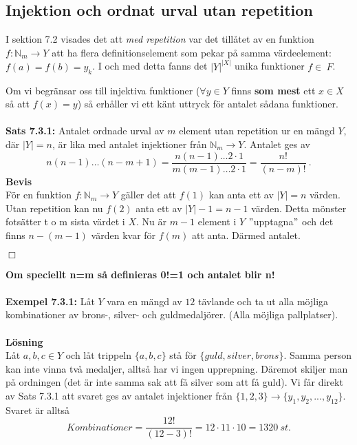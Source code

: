 \documentclass{article}
\begin{document}
\subsection{Injektion och ordnat urval utan repetition}
I sektion 7.2 visades det att \textit{med repetition} var det tillåtet av en funktion $f:\mathbb{N}_m\rightarrow Y$ att ha flera definitionselement som pekar på samma värdeelement: $f(a)=f(b)=y_k$. I och med detta fanns det $|Y|^{|X|}$ unika funktioner $f\in\ F$.

Om vi begränsar oss till injektiva funktioner ($\forall y\in Y$ finns \textbf{som mest} ett $x\in X$ så att $f(x)=y$) så erhåller vi ett känt uttryck för antalet sådana funktioner.\\ \\
\textbf{Sats 7.3.1:} Antalet ordnade urval av $m$ element utan repetition ur en mängd $Y$, där $|Y|=n$, är lika med antalet injektioner från $\mathbb{N}_m\rightarrow Y$. Antalet ges av 
$$
n(n-1)\hdots(n-m+1)=\frac{n(n-1)\hdots2\cdot1}{m(m-1)\hdots2\cdot1}=\frac{n!}{(n-m)!} \ .
$$
\textbf{Bevis}\\
För en funktion $f:\mathbb{N}_m\rightarrow Y$ gäller det att $f(1)$ kan anta ett av $|Y|=n$ värden. Utan repetition kan nu $f(2)$ anta ett av $|Y|-1=n-1$ värden. Detta mönster fotsätter t o m sista värdet i $X$. Nu är $m-1$ element i $Y$ $"$upptagna$"$ och det finns $n-(m-1)$ värden kvar för $f(m)$ att anta. Därmed antalet.
\begin{flushright}
$\Box$
\end{flushright}
\textbf{Om speciellt n=m så definieras 0!=1 och antalet blir n!}
\\ \\
\noindent
\textbf{Exempel 7.3.1:} Låt $Y$ vara en mängd av $12$ tävlande och ta ut alla möjliga kombinationer av brons-, silver- och guldmedaljörer. (Alla möjliga pallplatser).\\ \\
\textbf{Lösning}\\
Låt $a,b,c\in Y$ och låt trippeln $\{a,b,c\}$ stå för $\{guld,silver,brons\}$. Samma person kan inte vinna två medaljer, alltså har vi ingen upprepning. Däremot skiljer man på ordningen (det är inte samma sak att få silver som att få guld). Vi får direkt av Sats 7.3.1 att svaret ges av antalet injektioner från $\{1,2,3\}\rightarrow\{y_1,y_2,...,y_{12}\}$. Svaret är alltså
$$
Kombinationer=\frac{12!}{(12-3)!}=12\cdot11\cdot10=1320 \ st.
$$
\end{document}
